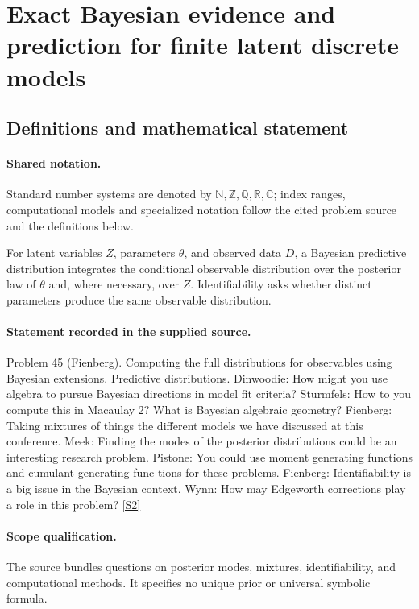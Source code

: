 \documentclass[11pt]{article}
\newcommand{\sref}[2]{\hyperlink{source:#1:#2}{[S#2]}}
\begin{document}
\section{Exact Bayesian evidence and prediction for finite latent discrete models}\label{statement}

\subsection{Definitions and mathematical statement}

\paragraph{Shared notation.}Standard number systems are denoted by $\mathbb N,\mathbb Z,\mathbb Q,\mathbb R,\mathbb C$; index ranges, computational models and specialized notation follow the cited problem source and the definitions below.


For latent variables $Z$, parameters $\theta$, and observed data $D$, a Bayesian predictive distribution integrates the conditional observable distribution over the posterior law of $\theta$ and, where necessary, over $Z$. Identifiability asks whether distinct parameters produce the same observable distribution.
\paragraph{Statement recorded in the supplied source.}
Problem 45 (Fienberg). Computing the full distributions for observables using Bayesian extensions. Predictive distributions. Dinwoodie: How might you use algebra to pursue Bayesian directions in model fit criteria? Sturmfels: How to you compute this in Macaulay 2? What is Bayesian algebraic geometry? Fienberg: Taking mixtures of things the different models we have discussed at this conference. Meek: Finding the modes of the posterior distributions could be an interesting research problem. Pistone: You could use moment generating functions and cumulant generating func-tions for these problems. Fienberg: Identifiability is a big issue in the Bayesian context. Wynn: How may Edgeworth corrections play a role in this problem? \sref{statement}{2}
\paragraph{Scope qualification.}
The source bundles questions on posterior modes, mixtures, identifiability, and computational methods. It specifies no unique prior or universal symbolic formula.
\end{document}
